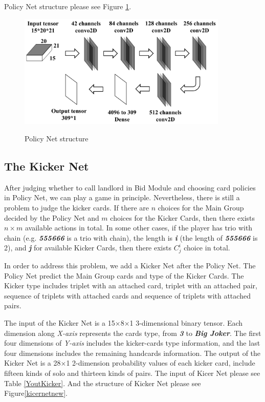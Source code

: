 \documentclass{article}
\begin{document}
Policy Net structure please see Figure \ref{PolicyNetFlow}.
\graphicspath{{Images/}}
\maketitle
\begin{figure}[htp]
    \caption{Policy Net structure} \label{PolicyNetFlow}
    \centering 
    \includegraphics[width=10cm]{PolicyNet1}
    \label{PolicyNetFlow} 
\end{figure}

\subsection{The Kicker Net}

After judging whether to call landlord in Bid Module and choosing card policies in Policy Net, we can play a game in principle. Nevertheless, there is still a problem to judge the kicker cards. If there are $n$ choices for the Main Group decided by the Policy Net and $m$ choices for the Kicker Cards, then there exists $n \times m$ available actions in total. In some other cases, if the player has trio with chain (e.g.  \textbf{\textit{555666}} is a trio with chain), the length is \textbf{\textit{i}} (the length of \textbf{\textit{555666}} is 2), and \textbf{\textit{j}} for available Kicker Cards, then there exists $C_j^i$ choice in total.

In order to address this problem, we add a Kicker Net after the Policy Net. The Policy Net predict the Main Group cards and type of the Kicker Cards. The Kicker type includes triplet with an attached card, triplet with an attached pair, sequence of triplets with attached cards and sequence of triplets with attached pairs. 

The input of the Kicker Net is a 15$\times$8$\times$1 3-dimensional binary tensor. Each dimension along \textit{X-axis} represents the cards type, from \textbf{\textit{3}} to \textbf{\textit{Big Joker}}. The first four dimensions of \textit{Y-axis} includes the kicker-cards type information, and the last four dimensions includes the remaining handcards information. The output of the Kicker Net is a 28$\times$1 2-dimension probability values of each kicker card, include fifteen kinds of solo and thirteen kinds of pairs. The input of Kicer Net please see Table \ref{YoutKicker}. And the structure of Kicker Net please see Figure\ref{kicernetnew}. 
\end{document}
